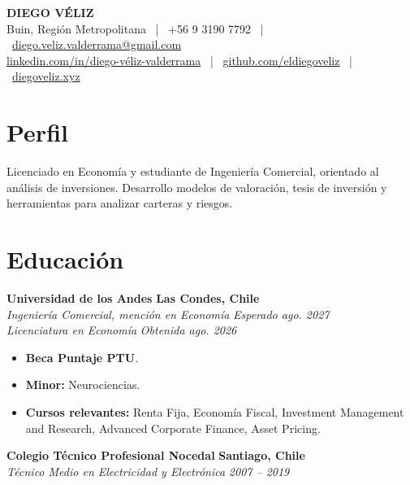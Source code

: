 \documentclass[10pt,letterpaper]{article}
\begin{document}
\pagestyle{empty}

\begin{center}
	\textbf{\Huge DIEGO VÉLIZ} \\ \vspace{4pt}
	Buin, Región Metropolitana \ | \ +56 9 3190 7792 \ |
	\ \href{mailto:diego.veliz.valderrama@gmail.com}
	{diego.veliz.valderrama@gmail.com} \\
	\href{https://linkedin.com/in/diego-véliz-valderrama}{linkedin.com/in/diego-véliz-valderrama}
	\ | \ \href{https://github.com/eldiegoveliz}{github.com/eldiegoveliz} \
	| \ \href{https://diegoveliz.xyz}{diegoveliz.xyz}
\end{center}

\section{Perfil}
Licenciado en Economía y estudiante de Ingeniería Comercial, orientado al
análisis de inversiones. Desarrollo modelos de valoración, tesis de inversión 
y herramientas para analizar carteras y riesgos.

\section{Educación}
\textbf{Universidad de los Andes} \hfill \textbf{Las Condes, Chile} \\
\textit{Ingeniería Comercial, mención en Economía} \hfill
\textit{Esperado ago. 2027} \\
\textit{Licenciatura en Economía} \hfill
\textit{Obtenida ago. 2026}
\begin{itemize}
	\item \textbf{Beca Puntaje PTU}.
	\item \textbf{Minor:} Neurociencias.
	\item \textbf{Cursos relevantes:} Renta Fija, Economía Fiscal,
		Investment Management and Research, Advanced Corporate Finance, 
		Asset Pricing.
\end{itemize}

\vspace{4pt}
\textbf{Colegio Técnico Profesional Nocedal}
\hfill \textbf{Santiago, Chile} \\
\textit{Técnico Medio en Electricidad y Electrónica}
\hfill \textit{2007 -- 2019}
\end{document}
